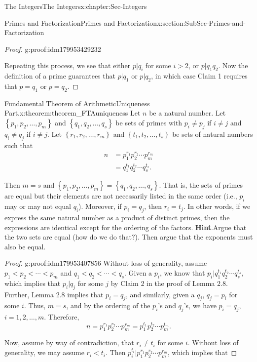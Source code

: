 \documentclass[oneside,10pt,]{book}
\newcommand{\blocktitlefont}{\relax}
\numberwithin{equation}{section}
\newcommand{\set}[1]{\left\{ {#1} \right\}}
\newcommand{\lt}{<}
\newcommand{\amp}{&}
\begin{document}
\begin{chapterptx}{The Integers}{}{The Integers}{}{}{x:chapter:Sec-Integers}
\begin{sectionptx}{Primes and Factorization}{}{Primes and Factorization}{}{}{x:section:SubSec-Primes-and-Factorization}
\begin{proof}{}{g:proof:idm179953429232}
\par
Repeating this process, we see that either \(p|q_i\) for some \(i > 2\), or \(p|q_1 q_2\). Now the definition of a prime guarantees that \(p|q_1\) or \(p|q_2\), in which case Claim 1 requires that \(p = q_1\) or \(p = q_2\).%
\end{proof}
\begin{theorem}{Fundamental Theorem of Arithmetic\textendash{}Uniqueness Part.}{}{x:theorem:theorem_FTAuniqueness}%
Let \(n\) be a natural number. Let \(\set{p_1,p_2,\ldots,p_m}\) and \(\set{q_1,q_2,\ldots,q_s}\) be sets of primes with \(p_i\ne p_j\) if \(i\ne j\) and \(q_i\ne q_j\) if \(i\ne j\). Let \(\set{r_1,r_2,\ldots,r_m}\) and \(\set{t_1,t_2,\ldots,t_s}\) be sets of natural numbers such that%
\begin{align*}
n \amp = p_1^{r_1} p_2^{r_2} \cdots p_m^{r_m}\\
\amp = q_1^{t_1} q_2^{t_2} \cdots q_s^{t_s}\text{.}
\end{align*}
%
\par
Then \(m = s\) and \(\set{p_1,p_2,\ldots,p_m} = \set{q_1,q_2,\ldots,q_s}\). That is, the sets of primes are equal but their elements are not necessarily listed in the same order (i.e., \(p_i\) may or may not equal \(q_i\)). Moreover, if \(p_i = q_j\), then \(r_i = t_j\). In other words, if we express the same natural number as a product of distinct primes, then the expressions are identical except for the ordering of the factors.%
\textbf{\blocktitlefont Hint}.\quad{}Argue that the two sets are equal (how do we do that?). Then argue that the exponents must also be equal.%
\end{theorem}
\begin{proof}{}{g:proof:idm179953407856}
Without loss of generality, assume \(p_1 \lt  p_2 \lt  \cdots \lt  p_m\) and \(q_1 \lt  q_2 \lt  \cdots \lt  q_s\). Given a \(p_i\), we know that \(p_i | q_1^{t_1} q_2^{t_2} \cdots q_s^{t_s}\), which implies that \(p_i | q_j\) for some \(j\) by Claim 2 in the proof of Lemma 2.8. Further, Lemma 2.8 implies that \(p_i = q_j\), and similarly, given a \(q_j\), \(q_j = p_i\) for some \(i\). Thus, \(m =s\), and by the ordering of the \(p_i\)'s and \(q_j\)'s, we have \(p_i = q_j\), \(i = 1, 2, \ldots, m\). Therefore,%
\begin{equation*}
n = p_1^{r_1} p_2^{r_2} \cdots p_m^{r_m} = p_1^{t_1} p_2^{t_2} \cdots p_m^{t_m}\text{.}
\end{equation*}
%
\par
Now, assume by way of contradiction, that \(r_i \ne t_i\) for some \(i\). Without loss of generality, we may assume \(r_i \lt  t_i\). Then \(p_i^{t_i} | p_1^{r_1} p_2^{r_2} \cdots p_m^{r_m}\), which implies that%

\end{proof}
\end{sectionptx}
\end{chapterptx}
\end{document}
